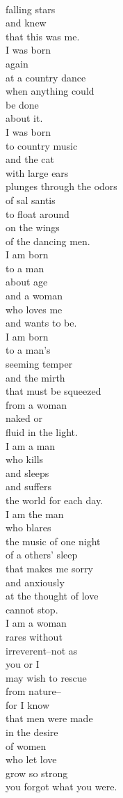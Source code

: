 \documentclass[smalldemyvopaper,11pt,twoside,onecolumn,openright,extrafontsizes]{memoir}
\begin{document}
\\falling stars
\\and knew
\\that this was me.
\\I was born
\\again
\\at a country dance
\\when anything could
\\be done
\\about it.
\\I was born
\\to country music
\\and the cat
\\with large ears
\\plunges through the odors
\\of sal santis
\\to float around
\\on the wings
\\of the dancing men.
\\I am born
\\to a man
\\about age
\\and a woman
\\who loves me
\\and wants to be.
\\I am born
\\to a man's
\\seeming temper
\\and the mirth
\\that must be squeezed
\\from a woman
\\naked or
\\fluid in the light.
\\I am a man
\\who kills
\\and sleeps
\\and suffers
\\the world for each day.
\\I am the man
\\who blares
\\the music of one night
\\of a others' sleep
\\that makes me sorry
\\and anxiously
\\at the thought of love
\\cannot stop.
\\I am a woman
\\rares without
\\irreverent--not as
\\you or I
\\may wish to rescue
\\from nature--
\\for I know
\\that men were made
\\in the desire
\\of women
\\who let love
\\grow so strong
\\you forgot what you were.
\end{document}
